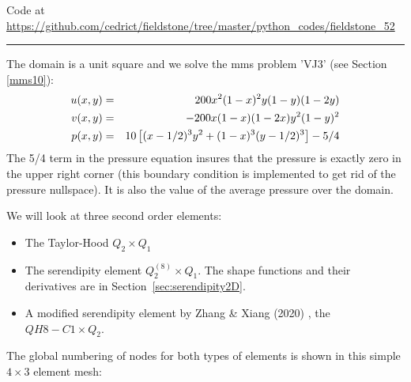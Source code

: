 

\begin{center}
Code at \url{https://github.com/cedrict/fieldstone/tree/master/python_codes/fieldstone_52}
\end{center}

\par\noindent\rule{\textwidth}{0.4pt}


The domain is a unit square and we solve the mms problem 'VJ3' (see Section~ \ref{mms10}):
\begin{eqnarray}
u(x,y) &=& 200x^2(1-x)^2y(1-y)(1-2y) \nonumber\\
v(x,y) &=& -200x(1-x)(1-2x)y^2(1-y)^2 \nonumber\\
p(x,y) &=& 10\left[(x-1/2)^3y^2+(1-x)^3(y-1/2)^3 \right] -5/4 \nonumber
\end{eqnarray}
The 5/4 term in the pressure equation insures that the pressure is exactly zero in the 
upper right corner (this boundary condition is implemented to get rid of 
the pressure nullspace). It is also the value of the average pressure over the domain.



We will look at three second order elements:
\begin{itemize}
\item The Taylor-Hood $Q_2\times Q_1$ 
\item The serendipity element $Q_2^{(8)}\times Q_1$. The shape functions 
and their derivatives are in Section~\ref{sec:serendipity2D}.
\item A modified serendipity element by 
Zhang \& Xiang (2020) \cite{zhxi20}, the $QH8-C1 \times Q_2$.
\end{itemize}

The global numbering of nodes for both types of elements is shown  
in this simple $4\times 3$ element mesh:

